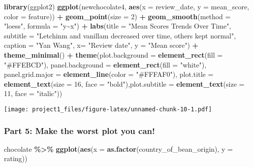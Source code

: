 \documentclass[
]{article}
\newenvironment{Shaded}{\begin{snugshade}}{\end{snugshade}}
\newcommand{\AttributeTok}[1]{\textcolor[rgb]{0.13,0.29,0.53}{#1}}
\newcommand{\DecValTok}[1]{\textcolor[rgb]{0.00,0.00,0.81}{#1}}
\newcommand{\FunctionTok}[1]{\textcolor[rgb]{0.13,0.29,0.53}{\textbf{#1}}}
\newcommand{\NormalTok}[1]{#1}
\newcommand{\SpecialCharTok}[1]{\textcolor[rgb]{0.81,0.36,0.00}{\textbf{#1}}}
\newcommand{\StringTok}[1]{\textcolor[rgb]{0.31,0.60,0.02}{#1}}
\begin{document}
\begin{Shaded}
\begin{Highlighting}[]
\FunctionTok{library}\NormalTok{(ggplot2)}
\FunctionTok{ggplot}\NormalTok{(newchocolate4, }\FunctionTok{aes}\NormalTok{(}\AttributeTok{x =}\NormalTok{ review\_date, }\AttributeTok{y =}\NormalTok{ mean\_score, }\AttributeTok{color =}\NormalTok{ feature)) }\SpecialCharTok{+} \FunctionTok{geom\_point}\NormalTok{(}\AttributeTok{size =} \DecValTok{2}\NormalTok{) }\SpecialCharTok{+} \FunctionTok{geom\_smooth}\NormalTok{(}\AttributeTok{method =} \StringTok{"loess"}\NormalTok{, }\AttributeTok{formula =} \StringTok{"y\textasciitilde{}x"}\NormalTok{) }\SpecialCharTok{+} \FunctionTok{labs}\NormalTok{(}\AttributeTok{title =} \StringTok{"Mean Scores Trends Over Time"}\NormalTok{, }\AttributeTok{subtitle =} \StringTok{"Letchinm and vanillam decreased over time, others kept normal"}\NormalTok{, }\AttributeTok{caption =} \StringTok{"Yan Wang"}\NormalTok{, }\AttributeTok{x=} \StringTok{"Review date"}\NormalTok{, }\AttributeTok{y =} \StringTok{"Mean score"}\NormalTok{) }\SpecialCharTok{+} \FunctionTok{theme\_minimal}\NormalTok{() }\SpecialCharTok{+} \FunctionTok{theme}\NormalTok{(}\AttributeTok{plot.background =} \FunctionTok{element\_rect}\NormalTok{(}\AttributeTok{fill =} \StringTok{"\#FFEBCD"}\NormalTok{), }\AttributeTok{panel.background =} \FunctionTok{element\_rect}\NormalTok{(}\AttributeTok{fill =} \StringTok{"white"}\NormalTok{), }\AttributeTok{panel.grid.major =} \FunctionTok{element\_line}\NormalTok{(}\AttributeTok{color =} \StringTok{"\#FFFAF0"}\NormalTok{), }\AttributeTok{plot.title =} \FunctionTok{element\_text}\NormalTok{(}\AttributeTok{size =} \DecValTok{16}\NormalTok{, }\AttributeTok{face =} \StringTok{"bold"}\NormalTok{),}\AttributeTok{plot.subtitle =} \FunctionTok{element\_text}\NormalTok{(}\AttributeTok{size =} \DecValTok{11}\NormalTok{, }\AttributeTok{face =} \StringTok{"italic"}\NormalTok{)) }
\end{Highlighting}
\end{Shaded}

\texttt{[image: project1\_files/figure-latex/unnamed-chunk-10-1.pdf]}

\hypertarget{part-5-make-the-worst-plot-you-can}{%
\subsubsection{Part 5: Make the worst plot you
can!}\label{part-5-make-the-worst-plot-you-can}}

\begin{Shaded}
\begin{Highlighting}[]
\NormalTok{chocolate }\SpecialCharTok{\%\textgreater{}\%} \FunctionTok{ggplot}\NormalTok{(}\FunctionTok{aes}\NormalTok{(}\AttributeTok{x =} \FunctionTok{as.factor}\NormalTok{(country\_of\_bean\_origin), }\AttributeTok{y =}\NormalTok{ rating))}
\end{Highlighting}
\end{Shaded}
\end{document}
